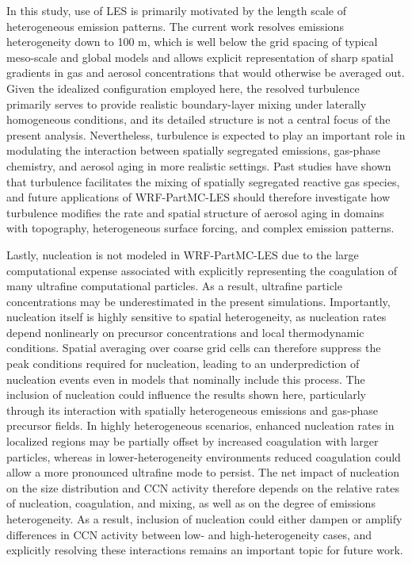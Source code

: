 \documentclass[acp, manuscript]{copernicus}
\begin{document}
In this study, use of LES is primarily motivated by the length scale
of heterogeneous emission patterns. The current work resolves
emissions heterogeneity down to 100 m, which is well below the grid
spacing of typical meso-scale and global models and allows explicit
representation of sharp spatial gradients in gas and aerosol
concentrations that would otherwise be averaged out. Given the
idealized configuration employed here, the resolved turbulence
primarily serves to provide realistic boundary-layer mixing under
laterally homogeneous conditions, and its detailed structure is not a
central focus of the present analysis. Nevertheless, turbulence is
expected to play an important role in modulating the interaction
between spatially segregated emissions, gas-phase chemistry, and
aerosol aging in more realistic settings. Past studies have shown that
turbulence facilitates the mixing of spatially segregated reactive gas
species, and future applications of WRF-PartMC-LES should therefore
investigate how turbulence modifies the rate and spatial structure of
aerosol aging in domains with topography, heterogeneous surface
forcing, and complex emission patterns.

Lastly, nucleation is not modeled in WRF-PartMC-LES due to the large computational expense associated with explicitly representing the coagulation of many ultrafine computational particles. As a result, ultrafine particle concentrations may be
  underestimated in the present simulations. Importantly, nucleation
  itself is highly sensitive to spatial heterogeneity, as nucleation
  rates depend nonlinearly on precursor concentrations and local
  thermodynamic conditions. Spatial averaging over coarse grid cells
  can therefore suppress the peak conditions required for nucleation,
  leading to an underprediction of nucleation events even in models
  that nominally include this process. The inclusion of nucleation
  could influence the results shown here, particularly through its
  interaction with spatially heterogeneous emissions and gas-phase
  precursor fields. In highly heterogeneous scenarios, enhanced
  nucleation rates in localized regions may be partially offset by
  increased coagulation with larger particles, whereas in
  lower-heterogeneity environments reduced coagulation could allow a
  more pronounced ultrafine mode to persist. The net impact of
  nucleation on the size distribution and CCN activity therefore
  depends on the relative rates of nucleation, coagulation, and
  mixing, as well as on the degree of emissions heterogeneity. As a
  result, inclusion of nucleation could either dampen or amplify
  differences in CCN activity between low- and high-heterogeneity
  cases, and explicitly resolving these interactions remains an
  important topic for future work.
\end{document}
